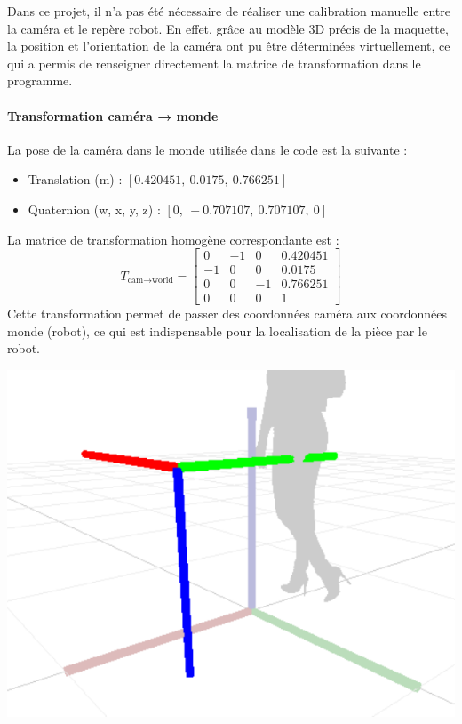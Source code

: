 Dans ce projet, il n'a pas été nécessaire de réaliser une calibration manuelle entre la caméra et le repère robot. En effet, grâce au modèle 3D précis de la maquette, la position et l'orientation de la caméra ont pu être déterminées virtuellement, ce qui a permis de renseigner directement la matrice de transformation dans le programme.

\begin{minipage}{0.55\textwidth}
    \paragraph{Transformation caméra → monde}
    La pose de la caméra dans le monde utilisée dans le code est la suivante :
    \begin{itemize}
        \item Translation (m) : $[0.420451,\ 0.0175,\ 0.766251]$
        \item Quaternion (w, x, y, z) : $[0,\ -0.707107,\ 0.707107,\ 0]$
    \end{itemize}
    {}%
    La matrice de transformation homogène correspondante est :
    \begin{equation*}
        T_{\text{cam} \to \text{world}} =
        \begin{bmatrix}
            0  & -1 & 0  & 0.420451 \\
            -1 & 0  & 0  & 0.0175   \\
            0  & 0  & -1 & 0.766251 \\
            0  & 0  & 0  & 1
        \end{bmatrix}
    \end{equation*}
    Cette transformation permet de passer des coordonnées caméra aux coordonnées monde (robot), ce qui est indispensable pour la localisation de la pièce par le robot.
\end{minipage}%
\hfill
\begin{minipage}{0.4\textwidth}
    \centering
    \includegraphics[width=0.95\linewidth]{assets/figures/Transform_example.png}
\end{minipage}

